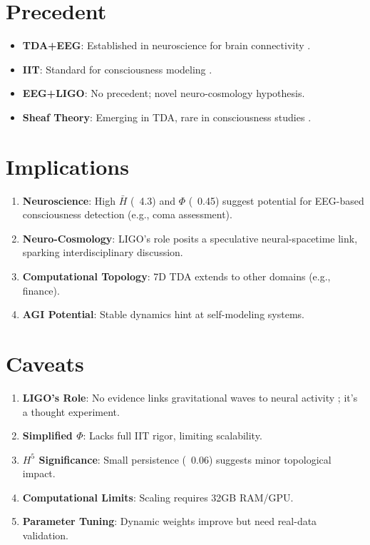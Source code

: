 \documentclass[11pt]{article}
\begin{document}
\section{Precedent}
\begin{itemize}
    \item \textbf{TDA+EEG}: Established in neuroscience for brain connectivity \cite{BlueBrain2024}.
    \item \textbf{IIT}: Standard for consciousness modeling \cite{Tononi2025}.
    \item \textbf{EEG+LIGO}: No precedent; novel neuro-cosmology hypothesis.
    \item \textbf{Sheaf Theory}: Emerging in TDA, rare in consciousness studies \cite{Robinson2017}.
\end{itemize}

\section{Implications}
\begin{enumerate}
    \item \textbf{Neuroscience}: High $\bar{H}$ (~4.3) and $\Phi$ (~0.45) suggest potential for EEG-based consciousness detection (e.g., coma assessment).
    \item \textbf{Neuro-Cosmology}: LIGO’s role posits a speculative neural-spacetime link, sparking interdisciplinary discussion.
    \item \textbf{Computational Topology}: 7D TDA extends to other domains (e.g., finance).
    \item \textbf{AGI Potential}: Stable dynamics hint at self-modeling systems.
\end{enumerate}

\section{Caveats}
\begin{enumerate}
    \item \textbf{LIGO’s Role}: No evidence links gravitational waves to neural activity \cite{LIGO2024}; it’s a thought experiment.
    \item \textbf{Simplified $\Phi$}: Lacks full IIT rigor, limiting scalability.
    \item \textbf{$H^5$ Significance}: Small persistence (~0.06) suggests minor topological impact.
    \item \textbf{Computational Limits}: Scaling requires 32GB RAM/GPU.
    \item \textbf{Parameter Tuning}: Dynamic weights improve but need real-data validation.
\end{enumerate}
\end{document}

